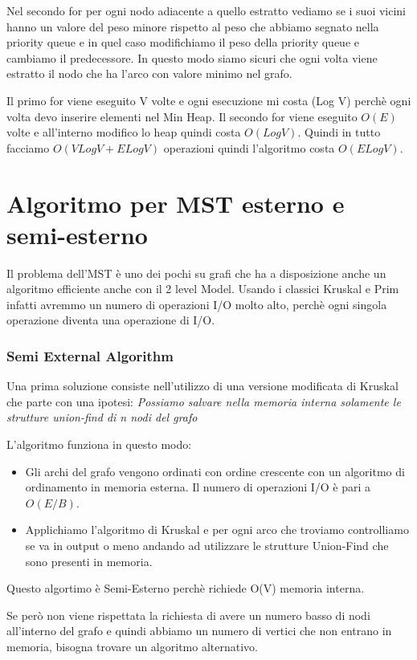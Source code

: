 \documentclass[14pt]{extreport}
\begin{document}
Nel secondo for per ogni nodo adiacente a quello estratto vediamo se i suoi vicini hanno un valore del peso minore rispetto al peso che abbiamo segnato nella priority queue e in quel caso modifichiamo il peso della priority queue e cambiamo il predecessore.
In questo modo siamo sicuri che ogni volta viene estratto il nodo che ha l'arco con valore minimo nel grafo.

Il primo for viene eseguito V volte e ogni esecuzione mi costa (Log V) perchè ogni volta devo inserire elementi nel Min Heap.
Il secondo for viene eseguito $O(E)$ volte e all'interno modifico lo heap quindi costa $O(Log V)$.
Quindi in tutto facciamo $O(VLogV + ELogV)$ operazioni quindi l'algoritmo costa $O(ELogV)$.

\chapter{Algoritmo per MST esterno e semi-esterno}

Il problema dell'MST è uno dei pochi su grafi che ha a disposizione anche un algoritmo efficiente anche con il 2 level Model.
Usando i classici Kruskal e Prim infatti avremmo un numero di operazioni I/O molto alto, perchè ogni singola operazione diventa una operazione di I/O.

\subsection{Semi External Algorithm}
Una prima soluzione consiste nell'utilizzo di una versione modificata di Kruskal che parte con una ipotesi:
\newline 
\textit{Possiamo salvare nella memoria interna solamente le strutture union-find di n nodi del grafo}

L'algoritmo funziona in questo modo:
\begin{itemize}
\item Gli archi del grafo vengono ordinati con ordine crescente con un algoritmo di ordinamento in memoria esterna. Il numero di operazioni I/O è pari a $O(E/B)$.
\item Applichiamo l'algoritmo di Kruskal e per ogni arco che troviamo controlliamo se va in output o meno andando ad utilizzare le strutture Union-Find che sono presenti in memoria.
\end{itemize}

Questo algortimo è Semi-Esterno perchè richiede O(V) memoria interna.

Se però non viene rispettata la richiesta di avere un numero basso di nodi all'interno del grafo e quindi abbiamo un numero di vertici che non entrano in memoria, bisogna trovare un algoritmo alternativo.
\end{document}
